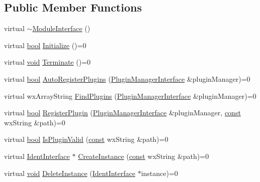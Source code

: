 \subsection*{Public Member Functions}
\begin{DoxyCompactItemize}
\item 
virtual \hyperlink{class_module_interface_a6d8e04b707d1238f8fb053647b6d91be}{$\sim$\+Module\+Interface} ()
\item 
virtual \hyperlink{mac_2config_2i386_2lib-src_2libsoxr_2soxr-config_8h_abb452686968e48b67397da5f97445f5b}{bool} \hyperlink{class_module_interface_ae86e3c39430a1f0064926499394b6b18}{Initialize} ()=0
\item 
virtual \hyperlink{sound_8c_ae35f5844602719cf66324f4de2a658b3}{void} \hyperlink{class_module_interface_afdc247794e14d0349eba226a99937cc9}{Terminate} ()=0
\item 
virtual \hyperlink{mac_2config_2i386_2lib-src_2libsoxr_2soxr-config_8h_abb452686968e48b67397da5f97445f5b}{bool} \hyperlink{class_module_interface_aa5e320d435260546bca290f9b02442e1}{Auto\+Register\+Plugins} (\hyperlink{class_plugin_manager_interface}{Plugin\+Manager\+Interface} \&plugin\+Manager)=0
\item 
virtual wx\+Array\+String \hyperlink{class_module_interface_a67404aee6f6274738dfab1a77fd36151}{Find\+Plugins} (\hyperlink{class_plugin_manager_interface}{Plugin\+Manager\+Interface} \&plugin\+Manager)=0
\item 
virtual \hyperlink{mac_2config_2i386_2lib-src_2libsoxr_2soxr-config_8h_abb452686968e48b67397da5f97445f5b}{bool} \hyperlink{class_module_interface_a587b584d609512afeb1900ad7e51b28b}{Register\+Plugin} (\hyperlink{class_plugin_manager_interface}{Plugin\+Manager\+Interface} \&plugin\+Manager, \hyperlink{getopt1_8c_a2c212835823e3c54a8ab6d95c652660e}{const} wx\+String \&path)=0
\item 
virtual \hyperlink{mac_2config_2i386_2lib-src_2libsoxr_2soxr-config_8h_abb452686968e48b67397da5f97445f5b}{bool} \hyperlink{class_module_interface_af9340edcd75451c2e9250ef4c93c740c}{Is\+Plugin\+Valid} (\hyperlink{getopt1_8c_a2c212835823e3c54a8ab6d95c652660e}{const} wx\+String \&path)=0
\item 
virtual \hyperlink{class_ident_interface}{Ident\+Interface} $\ast$ \hyperlink{class_module_interface_a23378e91840fac81e6b8217c5e6f1ad8}{Create\+Instance} (\hyperlink{getopt1_8c_a2c212835823e3c54a8ab6d95c652660e}{const} wx\+String \&path)=0
\item 
virtual \hyperlink{sound_8c_ae35f5844602719cf66324f4de2a658b3}{void} \hyperlink{class_module_interface_ac6c232762b6578d8bba4c5a74a65e8ed}{Delete\+Instance} (\hyperlink{class_ident_interface}{Ident\+Interface} $\ast$instance)=0
\end{DoxyCompactItemize}



